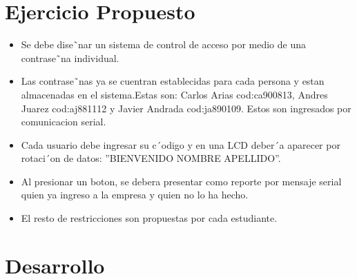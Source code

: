 \documentclass[10pt,a4paper]{article}
\begin{document}
\section{Ejercicio Propuesto}
\begin{itemize}
\item Se debe dise˜nar un sistema de control de acceso por medio de una contrase˜na individual.
\end{itemize}
\begin{itemize}
\item Las contrase˜nas ya se cuentran establecidas para cada persona y estan almacenadas en el sistema.Estas son: Carlos Arias cod:ca900813, Andres Juarez cod:aj881112 y Javier Andrada cod:ja890109. Estos son ingresados por comunicacion serial.
\end{itemize}
\begin{itemize}
\item Cada usuario debe ingresar su c´odigo y en una LCD deber´a aparecer por rotaci´on de datos: ”BIENVENIDO NOMBRE APELLIDO”.
\end{itemize}
\begin{itemize}
\item Al presionar un boton, se debera presentar como reporte por mensaje serial quien ya ingreso a la empresa y quien no lo ha hecho.
\end{itemize}
\begin{itemize}
\item El resto de restricciones son propuestas por cada estudiante.
\end{itemize}

\section{Desarrollo}
\end{document}
